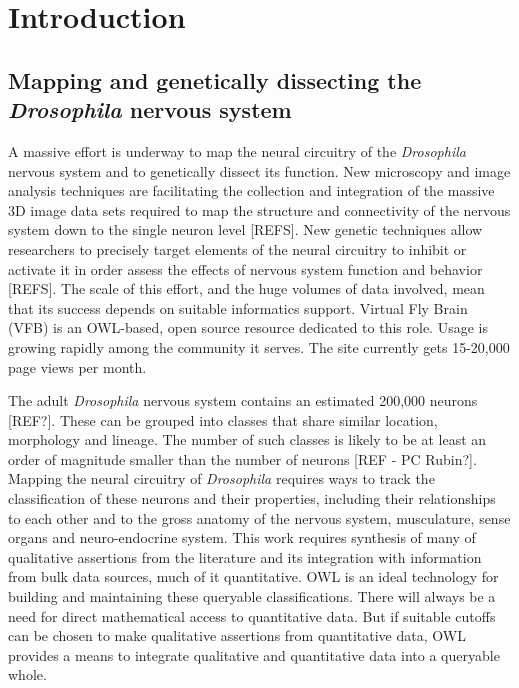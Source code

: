 \documentclass[runningheads,a4paper]{llncs}
\begin{document}
\section{Introduction}


\subsection{Mapping and genetically dissecting the \textit{Drosophila}
  nervous system}

  
A massive effort is underway to map the neural circuitry of the
\textit{Drosophila} nervous system and to genetically dissect its
function. New microscopy and image analysis techniques are
facilitating the collection and integration of the massive 3D image
data sets required to map the structure and connectivity of the
nervous system down to the single neuron level [REFS]. New genetic %
techniques allow researchers to precisely target elements of the
neural circuitry to inhibit or activate it in order assess the effects
of nervous system function and behavior [REFS]. The scale of this %
effort, and the huge volumes of data involved, mean that its success
depends on suitable informatics support. Virtual Fly Brain (VFB)
\cite{pmid22180411,pmid22402613} is an OWL-based, open source
resource dedicated to this role. Usage is growing rapidly among the community
it serves.  The site currently gets 15-20,000 page views per month.

The adult \textit{Drosophila} nervous system contains an estimated
200,000 neurons [REF?].  These can be grouped into classes that share
similar location, morphology and lineage.  The number of such classes
is likely to be at least an order of magnitude smaller than the number
of neurons [REF - PC Rubin?].  Mapping the neural circuitry of \textit{Drosophila}
requires ways to track the classification of these neurons and their
properties, including their relationships to each other and to the
gross anatomy of the nervous system, musculature, sense organs and
neuro-endocrine system.  This work requires synthesis of many of
qualitative assertions from the literature and its integration with
information from bulk data sources, much of it quantitative.  OWL
is an ideal technology for building and maintaining these queryable
classifications. There will always be a need for direct mathematical
access to quantitative data.  But if suitable cutoffs can be
chosen to make qualitative assertions from quantitative data, OWL
provides a means to integrate qualitative and quantitative data into a
queryable whole.
\end{document}
